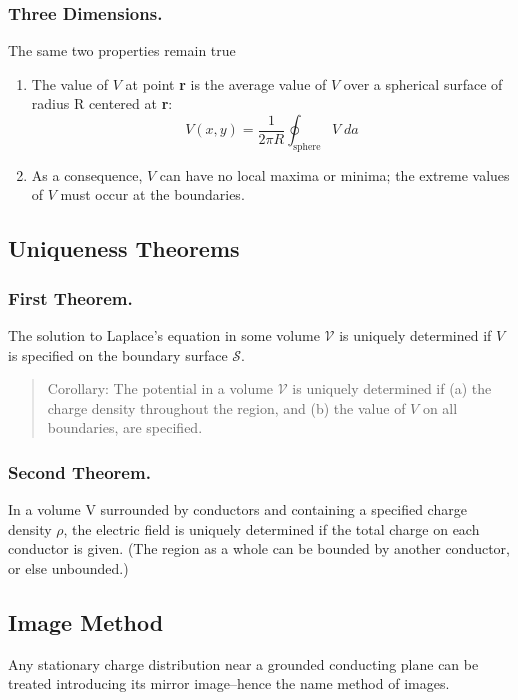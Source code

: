 \documentclass[../../../main.tex]{subfiles}
\begin{document}
\subsubsection*{Three Dimensions.} The same two properties remain true
\begin{enumerate}
    \item The value of $V$ at point \textbf{r} is the average value of $V$ over a spherical surface of radius R centered at \textbf{r}:
    \begin{equation*}
        V(x,y)=\frac{1}{2\pi R}\oint_{\text{sphere}}V\;da
    \end{equation*}
    \item As a consequence, $V$ can have no local maxima or minima; the extreme values of $V$ must occur at the boundaries. 
\end{enumerate}

\subsection*{Uniqueness Theorems}
\subsubsection*{First Theorem.} The solution to Laplace's equation in
    some volume $\mathcal{V}$ is uniquely determined if $V$ is specified on the boundary surface $\mathcal{S}$.

\begin{quote}
    Corollary: The potential in a volume $\mathcal{V}$ is uniquely determined if (a) the charge density throughout the region, and (b) the value of $V$ on all boundaries, are specified.
\end{quote}

\subsubsection*{Second Theorem.} In a volume V surrounded by conductors and containing a specified charge density $\rho$, the electric field is uniquely determined if the total charge on each conductor is given. (The region as a whole can be bounded by another conductor, or else unbounded.)

\subsection*{Image Method}
Any stationary charge distribution near a grounded conducting plane can be treated introducing its mirror image--hence the name method of images. 
\end{document}
